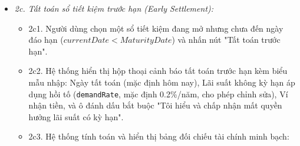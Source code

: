 \documentclass[11pt,a4paper]{article}
\providecommand{\tightlist}{
  \setlength{\itemsep}{0pt}\setlength{\parskip}{0pt}}
\begin{document}
\begin{itemize}
\begin{itemize}
    \begin{itemize}
    \tightlist
    \item
      2b1. Tại danh sách sổ tiết kiệm, Người dùng chọn một sổ đang mở có
      ngày hiện tại đã đến hoặc quá ngày đáo hạn
      (\(currentDate \ge MaturityDate\)) và nhấn nút "Tất toán đúng
      hạn".
    \item
      2b2. Hệ thống hiển thị biểu mẫu tất toán đúng hạn gồm: Mã sổ, Ngân
      hàng, Vốn gốc, Lãi suất, Số ngày gửi thực tế, Tiền lãi cam kết
      trọn kỳ (\(ExpectedInterest\)), Tổng số tiền thực nhận
      (\(Payout = Principal + ExpectedInterest\)), và danh sách chọn Ví
      thanh khoản nhận tiền.
    \item
      2b3. Người dùng chọn ví nhận tiền (trạng thái \texttt{ACTIVE}) và
      nhấn "Xác nhận tất toán".
    \item
      2b4. Hệ thống kiểm tra điều kiện ngày tất toán: bảo đảm
      \(currentDate \ge MaturityDate\).
    \item
      2b5. Hệ thống cộng số tiền \(Payout\) vào số dư khả dụng của ví
      nhận tiền theo quy tắc \texttt{BR-FIN-02}.
    \item
      2b6. Hệ thống cập nhật trạng thái sổ tiết kiệm sang
      \texttt{SETTLED\_MATURED}, ghi nhận ngày tất toán thực tế
      \texttt{settledDate\ =\ currentDate}, đóng sổ và ngừng tính lãi.
    \item
      2b7. Nếu sổ có liên kết với quỹ mục tiêu, hệ thống tự động gỡ liên
      kết sổ tiết kiệm khỏi quỹ mục tiêu đó theo quy tắc
      \texttt{BR-FIN-08}, trừ giá trị sổ khỏi quỹ tương ứng.
    \item
      2b8. Hệ thống hiển thị thông báo tất toán thành công kèm biên lai
      tóm tắt số tiền vốn gốc và tiền lãi đã nhập ví.
    \end{itemize}
  \item
    \emph{2c. Tất toán sổ tiết kiệm trước hạn (Early Settlement):}

    \begin{itemize}
    \tightlist
    \item
      2c1. Người dùng chọn một sổ tiết kiệm đang mở nhưng chưa đến ngày
      đáo hạn (\(currentDate < MaturityDate\)) và nhấn nút "Tất toán
      trước hạn".
    \item
      2c2. Hệ thống hiển thị hộp thoại cảnh báo tất toán trước hạn kèm
      biểu mẫu nhập: Ngày tất toán (mặc định hôm nay), Lãi suất không kỳ
      hạn áp dụng hồi tố (\texttt{demandRate}, mặc định 0.2\%/năm, cho
      phép chỉnh sửa), Ví nhận tiền, và ô đánh dấu bắt buộc "Tôi hiểu và
      chấp nhận mất quyền hưởng lãi suất có kỳ hạn".
    \item
      2c3. Hệ thống tính toán và hiển thị bảng đối chiếu tài chính minh
      bạch:


\end{itemize}
\end{itemize}
\end{itemize}
\end{document}
